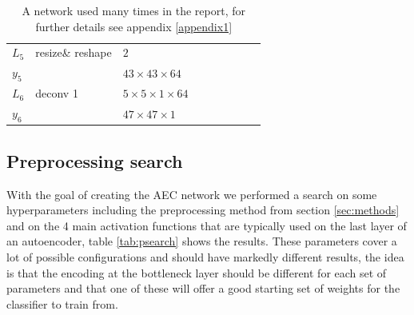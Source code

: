 \begin{table}[h!]
{\begin{tabular}{|lllllllll|}
\multicolumn{1}{|l|}{$L_5$}   & resize\& reshape & \multicolumn{1}{l|}{$2$}                    &          & \multicolumn{1}{l|}{}        \\
\multicolumn{1}{|l|}{$y_5$}   &          & \multicolumn{1}{l|}{$43\times43\times 64$}          &          & \multicolumn{1}{l|}{}        \\ \hline
\multicolumn{1}{|l|}{$L_6$}   & deconv 1   & \multicolumn{1}{l|}{$5\times 5\times1\times 64$}    &          & \multicolumn{1}{l|}{}\\
\multicolumn{1}{|l|}{$y_6$}   &          & \multicolumn{1}{l|}{$47\times47\times1$}           &          & \multicolumn{1}{l|}{}        \\ \hline
\end{tabular}

\caption{A network used many times in the report, for further details see appendix \ref{appendix1}} \label{compnet}

}
\end{table}

%
%
%
%
%
\subsection{Preprocessing search} \label{sec:psearc}

With the goal of creating the AEC network we performed a search on some hyperparameters
including the preprocessing method from section \ref{sec:methods} and on the 4 main activation functions
that are typically used on the last layer of an autoencoder, table \ref{tab:psearch} shows the results.
These parameters cover a lot of possible configurations and should have markedly different results, the idea
is that the encoding at the bottleneck layer should be different for each set of parameters and that
one of these will offer a good starting set of weights for the classifier to train from.

